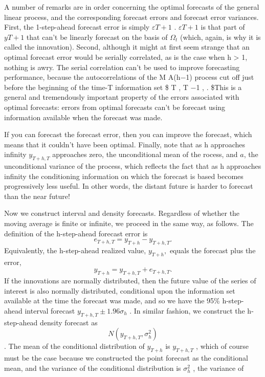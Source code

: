 \documentclass[]{article}
\begin{document}
A number of remarks are in order concerning the optimal forecasts of the
general linear process, and the corresponding forecast errors and
forecast error variances. First, the 1-step-ahead forecast error is
simply \(\varepsilon T +1\) . \(\varepsilon T +1\) is that part of
\(y T +1\) that can't be linearly forecast on the basis of \(\Omega_t\)
(which, again, is why it is called the innovation). Second, although it
might at first seem strange that an optimal forecast error would be
serially correlated, as is the case when h \textgreater{} 1, nothing is
awry. The serial correlation can't be used to improve forecasting
performance, because the autocorrelations of the M A(h−1) process cut
off just before the beginning of the time-T information set \$
\varepsilon T , \varepsilon T −1 , \cdots. \$This is a general and
tremendously important property of the errors associated with optimal
forecasts: errors from optimal forecasts can't be forecast using
information available when the forecast was made.

If you can forecast the forecast error, then you can improve the
forecast, which means that it couldn't have been optimal. Finally, note
that as h approaches infinity \(y_{ T +h,T}\) approaches zero, the
unconditional mean of the rocess, and \(a\), the unconditional variance
of the process, which reflects the fact that as h approaches infinity
the conditioning information on which the forecast is based becomes
progressively less useful. In other words, the distant future is harder
to forecast than the near future!

Now we construct interval and density forecasts. Regardless of whether
the moving average is finite or infinite, we proceed in the same way, as
follows. The definition of the h-step-ahead forecast error is
\[e_{ T +h,T} = y_{T +h} − y_{ T +h,T} .\] Equivalently, the
h-step-ahead realized value, \(y_{T +h} ,\) equals the forecast plus the
error, \[y_{T +h} = y_{ T +h,T} + e_{ T +h,T} .\] If the innovations are
normally distributed, then the future value of the series of interest is
also normally distributed, conditional upon the information set
available at the time the forecast was made, and so we have the 95\%
h-step- ahead interval forecast \(y_{ T +h,T} \pm 1.96\sigma_h\) . In
similar fashion, we construct the h-step-ahead density forecast as
\[N (y_{ T +h,T} , \sigma_h^2  )\]. The mean of the conditional
distribution of \(y_{T +h}\) is \(y_{ T +h,T}\) , which of course must
be the case because we constructed the point forecast as the conditional
mean, and the variance of the conditional distribution is \(\sigma_h^2\)
, the variance of
\end{document}
